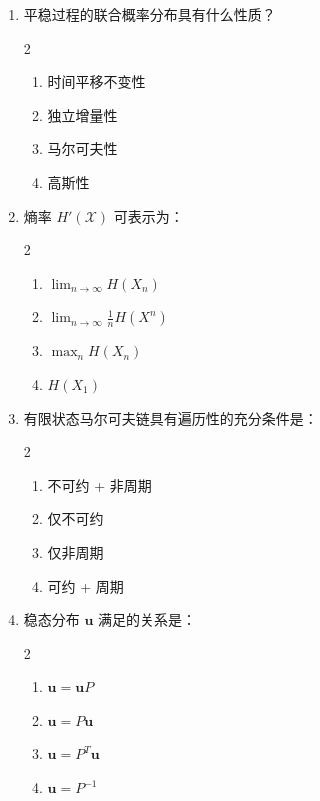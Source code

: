 \documentclass[12pt,a4paper]{ctexart}
\newcommand{\XX}{\mathcal{X}}
\begin{document}
\begin{enumerate}[label=\arabic*., leftmargin=*]

\item 平稳过程的联合概率分布具有什么性质？
\begin{multicols}{2}
\begin{enumerate}[label=(\Alph*)]
  \item 时间平移不变性
  \item 独立增量性
  \item 马尔可夫性
  \item 高斯性
\end{enumerate}
\end{multicols}

\item 熵率 $H'(\XX)$ 可表示为：
\begin{multicols}{2}
\begin{enumerate}[label=(\Alph*)]
  \item $\displaystyle\lim_{n\to\infty} H(X_n)$
  \item $\displaystyle\lim_{n\to\infty} \frac{1}{n}H(X^n)$
  \item $\displaystyle\max_n H(X_n)$
  \item $\displaystyle H(X_1)$
\end{enumerate}
\end{multicols}

\item 有限状态马尔可夫链具有遍历性的充分条件是：
\begin{multicols}{2}
\begin{enumerate}[label=(\Alph*)]
  \item 不可约 + 非周期
  \item 仅不可约
  \item 仅非周期
  \item 可约 + 周期
\end{enumerate}
\end{multicols}

\item 稳态分布 $\mathbf{u}$ 满足的关系是：
\begin{multicols}{2}
\begin{enumerate}[label=(\Alph*)]
  \item $\mathbf{u} = \mathbf{u} P$
  \item $\mathbf{u} = P\mathbf{u}$
  \item $\mathbf{u} = P^T\mathbf{u}$
  \item $\mathbf{u} = P^{-1}$
\end{enumerate}
\end{multicols}


\end{enumerate}
\end{document}
